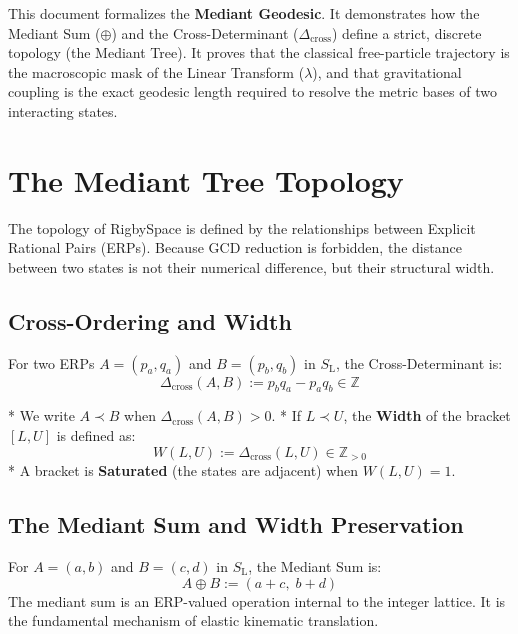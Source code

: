 \documentclass[11pt, letterpaper]{article}
\newcommand{\Z}{\mathbb{Z}}
\newcommand{\SL}{S_{\mathrm{L}}}
\newcommand{\Dcross}{\Delta_{\mathrm{cross}}}
\newcommand{\med}{\oplus}
\newcommand{\lop}{\lambda}
\begin{document}
This document formalizes the \textbf{Mediant Geodesic}. It demonstrates how the Mediant Sum ($\med$) and the Cross-Determinant ($\Dcross$) define a strict, discrete topology (the Mediant Tree). It proves that the classical free-particle trajectory is the macroscopic mask of the Linear Transform ($\lop$), and that gravitational coupling is the exact geodesic length required to resolve the metric bases of two interacting states.

\section{The Mediant Tree Topology}

The topology of RigbySpace is defined by the relationships between Explicit Rational Pairs (ERPs). Because GCD reduction is forbidden, the distance between two states is not their numerical difference, but their structural width.

\subsection{Cross-Ordering and Width}

\begin{definition}\label{def:width}
\begin{rsbox}
For two ERPs $A = (p_a, q_a)$ and $B = (p_b, q_b)$ in $\SL$, the Cross-Determinant is:
\[ \Dcross(A, B) := p_b q_a - p_a q_b \in \Z \]

*   We write $A \prec B$ when $\Dcross(A, B) > 0$.
*   If $L \prec U$, the \textbf{Width} of the bracket $[L, U]$ is defined as:
    \[ W(L, U) := \Dcross(L, U) \in \Z_{>0} \]
*   A bracket is \textbf{Saturated} (the states are adjacent) when $W(L, U) = 1$.
\end{rsbox}
\end{definition}

\subsection{The Mediant Sum and Width Preservation}

\begin{definition}\label{def:mediant}
\begin{rsbox}
For $A = (a, b)$ and $B = (c, d)$ in $\SL$, the Mediant Sum is:
\[ A \med B := (a + c,\; b + d) \]
The mediant sum is an ERP-valued operation internal to the integer lattice. It is the fundamental mechanism of elastic kinematic translation.
\end{rsbox}
\end{definition}
\end{document}
